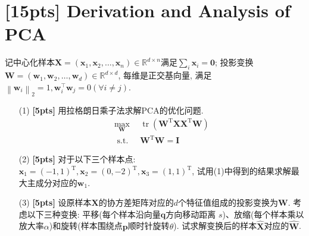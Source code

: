 \documentclass[a4paper,UTF8]{article}
\numberwithin{equation}{section}
\numberwithin{equation}{section}
\theoremstyle{definition}
\begin{document}
\newpage

\section{[15pts] Derivation and Analysis of PCA}
记中心化样本$\mathbf{X}=\left(\boldsymbol{x}_1, \boldsymbol{x}_2, \ldots, \boldsymbol{x}_n\right) \in \mathbb{R}^{d \times n}$满足$\sum_i \boldsymbol{x}_i=\mathbf{0}$; 投影变换$\mathbf{W}=\left(\boldsymbol{w}_1, \boldsymbol{w}_2, \ldots, \boldsymbol{w}_d\right) \in \mathbb{R}^{d \times d}$, 每维是正交基向量, 满足$\left\|\boldsymbol{w}_i\right\|_2=1, \boldsymbol{w}_i^{\top} \boldsymbol{w}_j=0(\forall i \neq j)$.

\begin{enumerate}
    \item[(1)] \textbf{[5pts]} 用拉格朗日乘子法求解PCA的优化问题.
    \begin{align*}
        \underset{\mathbf{W}}{\max }\ \ &  \operatorname{tr}\left(\mathbf{W}^{\mathrm{T}} \mathbf{X} \mathbf{X}^{\mathrm{T}} \mathbf{W}\right)\\
        \text { s.t. }\ & \mathbf{W}^{\mathrm{T}} \mathbf{W}=\mathbf{I}
    \end{align*}
    
    \item[(2)] \textbf{[5pts]} 对于以下三个样本点: $\boldsymbol{x}_1=(-1, 1)^{\mathrm{T}}, \boldsymbol{x}_2=(0, -2)^{\mathrm{T}}, \boldsymbol{x}_3=(1, 1)^{\mathrm{T}}$, 试用(1)中得到的结果求解最大主成分对应的$\boldsymbol{w}_1$.
    
    \item[(3)] \textbf{[5pts]} 设原样本$\mathbf{X}$的协方差矩阵对应的$d$个特征值组成的投影变换为$\mathbf{W}$. 考虑以下三种变换: 平移(每个样本沿向量$\boldsymbol{q}$方向移动距离 $s$)、放缩(每个样本乘以放大率$\alpha$)和旋转(样本围绕点$\boldsymbol{p}$顺时针旋转$\theta$). 试求解变换后的样本$\hat{\mathbf{X}}$对应的$\hat{\mathbf{W}}$.

\end{enumerate}
\end{document}
